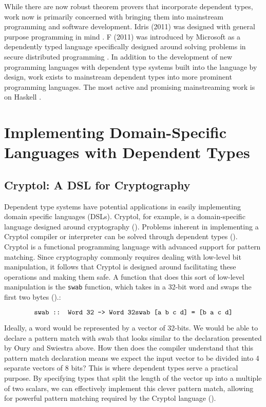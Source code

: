 While there are now robust theorem provers that incorporate dependent types,
work now is primarily concerned with bringing them into mainstream programming
and software development. Idris (2011) was designed with general purpose
programming in mind \cite{tdd_book}. F\* (2011) was introduced by Microsoft as a
dependently typed language specifically designed around solving problems in
secure distributed programming \cite{fstar_distributed_programming}. In addition
to the development of new programming languages with dependent type systems
built into the language by design, work exists to mainstream dependent types
into more prominent programming languages. The most active and promising
mainstreaming work is on Haskell \cite{eisenberg2016, gundry2013}. 

\section{Implementing Domain-Specific Languages with Dependent Types}

\subsection{Cryptol: A DSL for Cryptography}

Dependent type systems have potential applications in easily implementing domain
specific languages (DSLs). Cryptol, for example, is a domain-specific language
designed around cryptography (\cite{cryptol_manual}). Problems inherent in
implementing a Cryptol compiler or interpreter can be solved through dependent
types (\cite{power_of_pi}). Cryptol is a functional programming language with
advanced support for pattern matching. Since cryptography commonly requires
dealing with low-level bit manipulation, it follows that Cryptol is designed
around facilitating these operations and making them safe. A function that does
this sort of low-level manipulation is the \texttt{swab} function, which takes
in a 32-bit word and swaps the first two bytes (\cite{cryptol_manual}).: 

$$
\texttt{swab :: Word 32 -> Word 32} \\
\texttt{swab [a b c d] = [b a c d]} $$

Ideally, a word would be represented by a vector of 32-bits. We would be able to
declare a pattern match with swab that looks similar to the declaration
presented by Oury and Swiestra above. How then does the compiler understand that
this pattern match declaration means we expect the input vector to be divided
into 4 separate vectors of 8 bits? This is where dependent types serve a
practical purpose. By specifying types that split the length of the vector up
into a multiple of two scalars, we can effectively implement this clever pattern
match, allowing for powerful pattern matching required by the Cryptol language
(\cite{power_of_pi}). 

